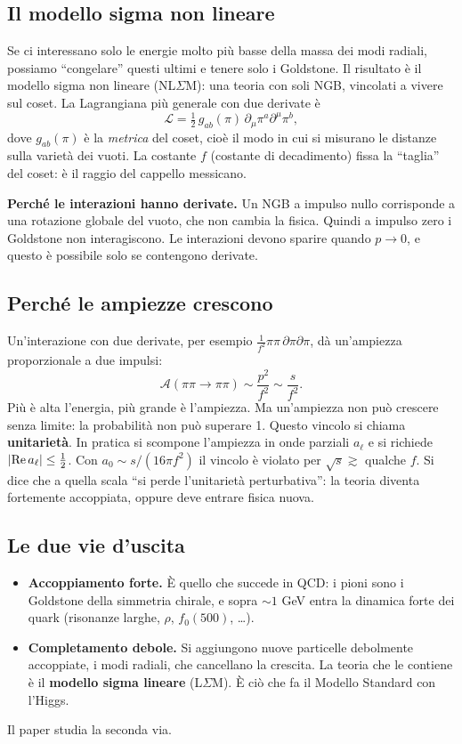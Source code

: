 \documentclass[11pt,a4paper]{article}
\numberwithin{equation}{section}
\theoremstyle{remark}
\begin{document}
\subsection{Il modello sigma non lineare}

Se ci interessano solo le energie molto più basse della massa dei modi radiali, possiamo ``congelare'' questi ultimi e tenere solo i Goldstone. Il risultato è il modello sigma non lineare (NL$\Sigma$M): una teoria con soli NGB, vincolati a vivere sul coset. La Lagrangiana più generale con due derivate è
\begin{equation}
\mathcal L=\tfrac12\,g_{ab}(\pi)\,\partial_\mu\pi^a\partial^\mu\pi^b ,
\end{equation}
dove $g_{ab}(\pi)$ è la \emph{metrica} del coset, cioè il modo in cui si misurano le distanze sulla varietà dei vuoti. La costante $f$ (costante di decadimento) fissa la ``taglia'' del coset: è il raggio del cappello messicano.

\textbf{Perché le interazioni hanno derivate.} Un NGB a impulso nullo corrisponde a una rotazione globale del vuoto, che non cambia la fisica. Quindi a impulso zero i Goldstone non interagiscono. Le interazioni devono sparire quando $p\to0$, e questo è possibile solo se contengono derivate.

\subsection{Perché le ampiezze crescono}

Un'interazione con due derivate, per esempio $\frac{1}{f^2}\pi\pi\,\partial\pi\partial\pi$, dà un'ampiezza proporzionale a due impulsi:
\[
\mathcal A(\pi\pi\to\pi\pi)\sim\frac{p^2}{f^2}\sim\frac{s}{f^2}.
\]
Più è alta l'energia, più grande è l'ampiezza. Ma un'ampiezza non può crescere senza limite: la probabilità non può superare 1. Questo vincolo si chiama \textbf{unitarietà}. In pratica si scompone l'ampiezza in onde parziali $a_\ell$ e si richiede $|{\rm Re}\,a_\ell|\le\frac12$. Con $a_0\sim s/(16\pi f^2)$ il vincolo è violato per $\sqrt s\gtrsim$ qualche $f$. Si dice che a quella scala ``si perde l'unitarietà perturbativa'': la teoria diventa fortemente accoppiata, oppure deve entrare fisica nuova.

\subsection{Le due vie d'uscita}

\begin{itemize}
\item \textbf{Accoppiamento forte.} È quello che succede in QCD: i pioni sono i Goldstone della simmetria chirale, e sopra $\sim1$ GeV entra la dinamica forte dei quark (risonanze larghe, $\rho$, $f_0(500)$, \ldots).
\item \textbf{Completamento debole.} Si aggiungono nuove particelle debolmente accoppiate, i modi radiali, che cancellano la crescita. La teoria che le contiene è il \textbf{modello sigma lineare} (L$\Sigma$M). È ciò che fa il Modello Standard con l'Higgs.
\end{itemize}
Il paper studia la seconda via.
\end{document}
